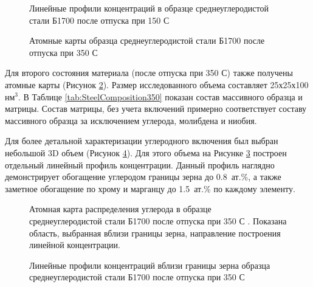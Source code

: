 \begin{figure}[ht]
	\caption{Линейные профили концентраций в образце среднеуглеродистой стали Б1700 после отпуска при 150 \textdegree С \cite{scbibRyabov}}
	\label{fig:SteelLinear1}
\end{figure}

\begin{figure}[htb]
	\caption{Атомные карты образца среднеуглеродистой стали Б1700 после отпуска при 350 \textdegree С \cite{scbibRyabov}}
	\label{fig:SteelAtomMaps2}
\end{figure}

Для второго состояния материала (после отпуска при 350 \textdegree С) также получены атомные карты (Рисунок \cref{fig:SteelAtomMaps2}). Размер исследованного объема составляет 25х25х100 нм$^{3}$. В Таблице \cref{tab:SteelComposition350} показан состав массивного образца и матрицы. Состав матрицы, без учета включений примерно соответствует составу массивного образца за исключением углерода, молибдена и ниобия. 

Для более детальной характеризации углеродного включения был выбран небольшой 3D объем (Рисунок \cref{fig:SteelLinear2}). Для этого объема на Рисунке \cref{fig:SteelAtomMapsLin} построен отдельный линейный профиль концентрации.  Данный профиль наглядно демонстрирует обогащение углеродом границы зерна до 0.8~ат.\%, а также заметное обогащение по хрому и марганцу до 1.5~ат.\% по каждому элементу.

\begin{figure}[htb]
	\caption{Атомная карта распределения углерода в образце среднеуглеродистой стали Б1700 после отпуска при 350 \textdegree С \cite{scbibRyabov}. Показана область, выбранная вблизи границы зерна,  направление построения линейной концентрации.}
	\label{fig:SteelAtomMapsLin}
\end{figure}

\begin{figure}[htb]
	\caption{Линейные профили концентраций вблизи границы зерна образца среднеуглеродистой стали Б1700 после отпуска при 350 \textdegree С \cite{scbibRyabov}}
	\label{fig:SteelLinear2}
\end{figure}

